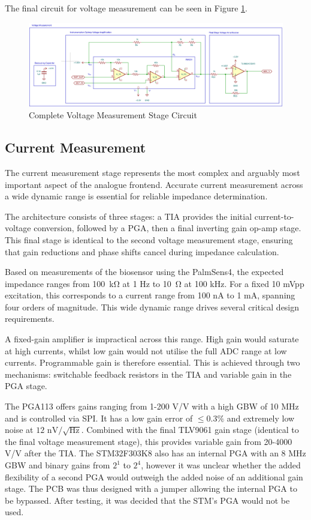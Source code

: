 The final circuit for voltage measurement can be seen in Figure \ref{fig:vmeas_stage_circuit}.

\begin{figure}[H]
    \centering
    \includegraphics[width=\textwidth]{VMeasSchem.png}
    \caption{Complete Voltage Measurement Stage Circuit}
    \label{fig:vmeas_stage_circuit}
\end{figure}

\subsection{Current Measurement}\label{subsec:design_cur}
The current measurement stage represents the most complex and arguably most important aspect of the analogue frontend. Accurate current measurement across a wide dynamic range is essential for reliable impedance determination.

The architecture consists of three stages: a \ac{TIA} provides the initial current-to-voltage conversion, followed by a \ac{PGA}, then a final inverting gain op-amp stage. This final stage is identical to the second voltage measurement stage, ensuring that gain reductions and phase shifts cancel during impedance calculation.

Based on measurements of the biosensor using the PalmSens4, the expected impedance ranges from \SI{100}{\kilo\ohm} at 1 Hz to \SI{10}{\ohm} at 100 kHz. For a fixed 10 mVpp excitation, this corresponds to a current range from 100 nA to 1 mA, spanning four orders of magnitude. This wide dynamic range drives several critical design requirements.

A fixed-gain amplifier is impractical across this range. High gain would saturate at high currents, whilst low gain would not utilise the full \ac{ADC} range at low currents. Programmable gain is therefore essential. This is achieved through two mechanisms: switchable feedback resistors in the \ac{TIA} and variable gain in the \ac{PGA} stage.

The PGA113 offers gains ranging from 1-200 V/V with a high GBW of 10 MHz and is controlled via SPI. It has a low gain error of $\le0.3\%$ and extremely low noise at $12\text{ nV}/\sqrt{\text{Hz}}$. Combined with the final TLV9061 gain stage (identical to the final voltage measurement stage), this provides variable gain from 20-4000 V/V after the \ac{TIA}. The STM32F303K8 also has an internal \ac{PGA} with an 8 MHz GBW and binary gains from $2^1$ to $2^4$, however it was unclear whether the added flexibility of a second PGA would outweigh the
added noise of an additional gain stage. The PCB was thus designed with a jumper allowing the internal \ac{PGA} to be bypassed. After testing, it was decided that the STM's PGA would not be used.

